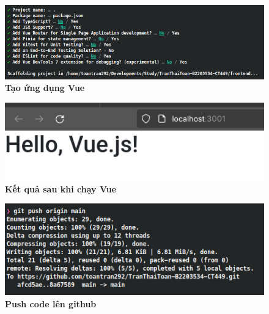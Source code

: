 {}
\setcounter{section}{1}
{}
{}
\setcounter{subsection}{1}
\setcounter{figure}{0}
\begin{figure}[H]
    \centering
    \includegraphics[width=15cm]{imgs/1.png}
    \caption{\bfseries Tạo ứng dụng Vue}
\end{figure}
\begin{figure}[H]
    \centering
    \includegraphics[width=15cm]{imgs/2.png}
    \caption{\bfseries Kết quả sau khi chạy Vue}
\end{figure}

{}
\setcounter{subsection}{1}
\setcounter{figure}{0}
\begin{figure}[H]
    \centering
    \includegraphics{imgs/4.png}
    \caption{\bfseries Push code lên github}
\end{figure}

